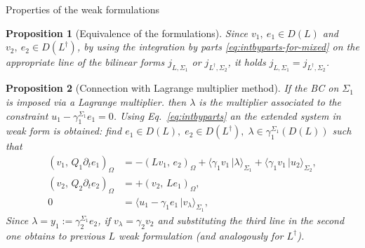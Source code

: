 \documentclass[aspectratio=169]{beamer}
\newcommand{\inner}[3][]{\ensuremath{( #2, \, #3 )_{#1}}}
\newcommand{\dualpr}[3][]{\ensuremath{\langle #2 \, \vert #3 \rangle_{#1}}}
\newtheorem{proposition}{Proposition}
\begin{document}
\begin{frame}{Properties of the weak formulations}
	\begin{proposition}[Equivalence of the formulations]\label{pr:equivalence}
		Since $v_1,\ e_1 \in D(L)$ and $v_2,\ e_2 \in D(L^\dag)$, by using the integration by parts \eqref{eq:intbyparts-for-mixed}  on the appropriate line of the bilinear forms $j_{L,\Sigma_1}$ or $j_{L^\dag,\Sigma_2}$, it holds $j_{L,\Sigma_1} = j_{L^\dag,\Sigma_2}$. 
	\end{proposition}

\begin{proposition}[Connection with Lagrange multiplier method]
If the BC on $\Sigma_1$ is imposed via a Lagrange multiplier. then $\lambda$ is the multiplier associated to  the constraint $u_1 - \gamma_1^{\Sigma_1} e_1 = 0$. Using 
Eq.~\eqref{eq:intbyparts} an the extended system in weak form is obtained: find $e_1 \in D(L), \; e_2 \in D(L^\dag), \; \lambda \in \gamma_1^{\Sigma_1}\left(D(L)\right)$ such that
\begin{equation*}
	\begin{aligned}
		\inner[\Omega]{v_1}{Q_1 \partial_t e_1} &= -\inner[\Omega]{L v_1}{e_2}
		+\dualpr[\Sigma_1]{\gamma_1 v_1}{\lambda}
		+\dualpr[\Sigma_2]{\gamma_1 v_1}{u_2}, \\
		\inner[\Omega]{v_2}{Q_2 \partial_t e_2} &= +\inner[\Omega]{v_2}{L e_1}, \\
		0 &= \dualpr[\Sigma_1]{u_1 - \gamma_1 e_1}{v_\lambda},
	\end{aligned}
\end{equation*}
Since $\lambda = y_1 := \gamma_2^{\Sigma_1} e_2$, if $v_\lambda = \gamma_2 v_2$ and substituting the third line in the second one obtains to previous $L$ weak formulation (and analogously for $L^\dag$).

\end{proposition}

\end{frame}
\end{document}
